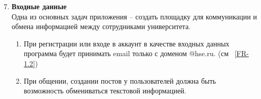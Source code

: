 \renewcommand{\labelenumi}{\textbf{FR-\arabic{enumi}}.}

\renewcommand{\labelenumii}{\textbf{FR-\arabic{enumi}.\arabic{enumii}}.}

\renewcommand{\labelenumiii}{\arabic{enumiii}.}
\begin{enumerate}
	\setcounter{enumi}{6}
	\item \textbf{Входные данные\\}
	Одна из основных задач приложения -- создать площадку для коммуникации и обмена информацией между сотрудниками университета.
	 \begin{enumerate}
		\item При регистрации или входе в аккаунт в качестве входных данных программа будет принимать email только с доменом @hse.ru. (см ~\ref{FR-1.2})
		\item При общении, создании постов у пользователей должна быть возможность обмениваться текстовой информацией. 
	\end{enumerate}
\end{enumerate}
\renewcommand{\labelenumi}{\arabic{enumi}.}

\renewcommand{\labelenumii}{\arabic{enumii}.}

\renewcommand{\labelenumiii}{\arabic{enumiii}.}
